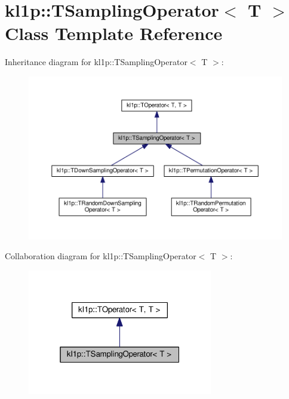 \hypertarget{classkl1p_1_1TSamplingOperator}{}\section{kl1p\+:\+:T\+Sampling\+Operator$<$ T $>$ Class Template Reference}
\label{classkl1p_1_1TSamplingOperator}


Inheritance diagram for kl1p\+:\+:T\+Sampling\+Operator$<$ T $>$\+:
\nopagebreak
\begin{figure}[H]
\begin{center}
\leavevmode
\includegraphics[width=350pt]{classkl1p_1_1TSamplingOperator__inherit__graph}
\end{center}
\end{figure}


Collaboration diagram for kl1p\+:\+:T\+Sampling\+Operator$<$ T $>$\+:
\nopagebreak
\begin{figure}[H]
\begin{center}
\leavevmode
\includegraphics[width=229pt]{classkl1p_1_1TSamplingOperator__coll__graph}
\end{center}
\end{figure}
